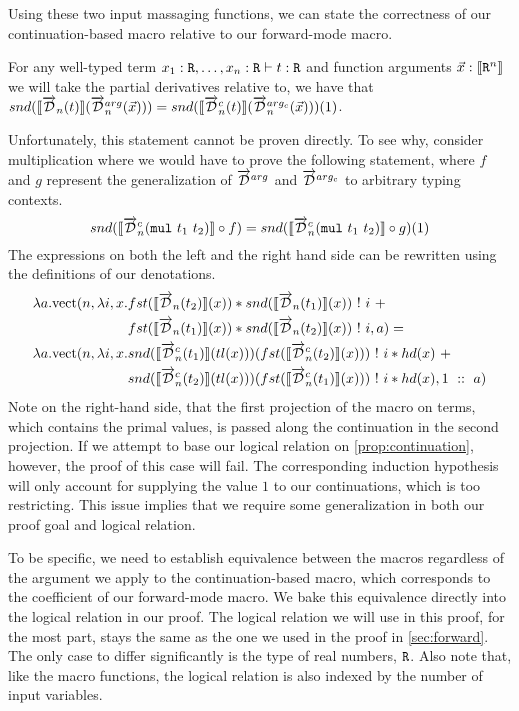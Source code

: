   Using these two input massaging functions, we can state the correctness of our continuation-based macro relative to our forward-mode macro.
  \begin{proposition}\label{prop:continuation}
    For any well-typed term $x_1 : \texttt{R}, \dots, x_n : \texttt{R} \vdash t : \texttt{R}$ and function arguments $\vec{x} : \llbracket \texttt{R}^n \rrbracket$ we will take the partial derivatives relative to, we have that $snd(\llbracket\overrightarrow{\mathcal{D}}_n(t)\rrbracket (\overrightarrow{\mathcal{D}}^{arg}_n(\vec{x}))) = snd(\llbracket\overrightarrow{\mathcal{D}}^c_n(t)\rrbracket (\overrightarrow{\mathcal{D}}^{arg_c}_n(\vec{x})))(1)$.
  \end{proposition}
  Unfortunately, this statement cannot be proven directly.
  To see why, consider multiplication where we would have to prove the following statement, where $f$ and $g$ represent the generalization of $\overrightarrow{\mathcal{D}}^{arg}$ and $\overrightarrow{\mathcal{D}}^{arg_c}$ to arbitrary typing contexts.
  \begin{equation*}
    snd(\llbracket \overrightarrow{\mathcal{D}}^c_n(\texttt{mul}\ t_1\ t_2) \rrbracket \circ f)= snd(\llbracket \overrightarrow{\mathcal{D}}^c_n(\texttt{mul}\ t_1\ t_2) \rrbracket \circ g)(1)
  \end{equation*}
  The expressions on both the left and the right hand side can be rewritten using the definitions of our denotations.
  \begin{align*}
    \lambda a. \text{vect}(n, \lambda i, x. &fst(\llbracket \overrightarrow{\mathcal{D}}_n(t_2) \rrbracket(x)) * snd(\llbracket \overrightarrow{\mathcal{D}}_n(t_1)\rrbracket(x))\ !\ i\ + \\
      &fst(\llbracket \overrightarrow{\mathcal{D}}_n(t_1) \rrbracket(x)) * snd(\llbracket \overrightarrow{\mathcal{D}}_n(t_2)\rrbracket(x))\ !\ i, a) = \\
    \lambda a. \text{vect}(n, \lambda i, x. &snd(\llbracket \overrightarrow{\mathcal{D}}^c_n(t_1) \rrbracket(tl(x)))(fst(\llbracket \overrightarrow{\mathcal{D}}^c_n(t_2)\rrbracket(x)))\ !\ i * hd(x)\ + \\
    &snd(\llbracket \overrightarrow{\mathcal{D}}^c_n(t_2) \rrbracket(tl(x)))(fst(\llbracket \overrightarrow{\mathcal{D}}^c_n(t_1)\rrbracket(x)))\ !\ i * hd(x), 1\ ::\ a)
  \end{align*}
  Note on the right-hand side, that the first projection of the macro on terms, which contains the primal values, is passed along the continuation in the second projection.
  If we attempt to base our logical relation on \cref{prop:continuation}, however, the proof of this case will fail.
  The corresponding induction hypothesis will only account for supplying the value $1$ to our continuations, which is too restricting.
  This issue implies that we require some generalization in both our proof goal and logical relation.

  To be specific, we need to establish equivalence between the macros regardless of the argument we apply to the continuation-based macro, which corresponds to the coefficient of our forward-mode macro.
  We bake this equivalence directly into the logical relation in our proof.
  The logical relation we will use in this proof, for the most part, stays the same as the one we used in the proof in \cref{sec:forward}.
  The only case to differ significantly is the type of real numbers, $\texttt{R}$.
  Also note that, like the macro functions, the logical relation is also indexed by the number of input variables.

